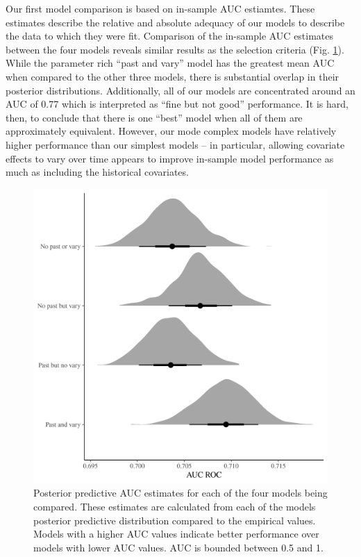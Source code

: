 \documentclass[12pt,letterpaper]{article}
\begin{document}
Our first model comparison is based on in-sample AUC estiamtes. These estimates describe the relative and absolute adequacy of our models to describe the data to which they were fit. Comparison of the in-sample AUC estimates between the four models reveals similar results as the selection criteria (Fig. \ref{fig:roc_hist}). While the parameter rich ``past and vary'' model has the greatest mean AUC when compared to the other three models, there is substantial overlap in their posterior distributions. Additionally, all of our models are concentrated around an AUC of 0.77 which is interpreted as ``fine but not good'' performance. It is hard, then, to conclude that there is one ``best'' model when all of them are approximately equivalent. However, our mode complex models have relatively higher performance than our simplest models -- in particular, allowing covariate effects to vary over time appears to improve in-sample model performance as much as including the historical covariates.
\begin{figure}[ht]
  \centering
  \includegraphics[width=\textwidth,height=0.5\textheight,keepaspectratio=true]{../results/figure/roc_hist}
  \caption{Posterior predictive AUC estimates for each of the four models being compared. These estimates are calculated from each of the models posterior predictive distribution compared to the empirical values. Models with a higher AUC values indicate better performance over models with lower AUC values. AUC is bounded between 0.5 and 1.}
  \label{fig:roc_hist}
\end{figure}
\end{document}
